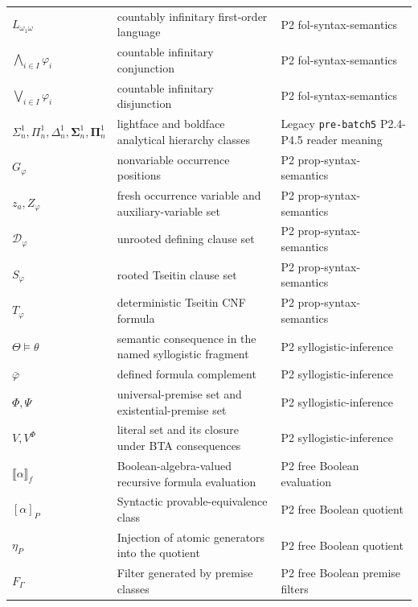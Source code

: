 \begin{longtable}{@{}p{}p{}p{}@{}}
\(L_{\omega_1\omega}\) & countably infinitary first-order language & P2 fol-\allowbreak{}syntax-\allowbreak{}semantics \\
\(\bigwedge_{i\in I}\varphi_i\) & countable infinitary conjunction & P2 fol-\allowbreak{}syntax-\allowbreak{}semantics \\
\(\bigvee_{i\in I}\varphi_i\) & countable infinitary disjunction & P2 fol-\allowbreak{}syntax-\allowbreak{}semantics \\
\(\Sigma^1_n,\allowbreak \Pi^1_n,\allowbreak \Delta^1_n,\allowbreak \boldsymbol\Sigma^1_n,\allowbreak \boldsymbol\Pi^1_n\) & lightface and boldface analytical hierarchy classes & Legacy \texttt{pre-\allowbreak{}batch5} P2.\allowbreak{}4-\allowbreak{}P4.\allowbreak{}5 reader meaning \\
\(G_\varphi\) & nonvariable occurrence positions & P2 prop-\allowbreak{}syntax-\allowbreak{}semantics \\
\(z_a,\allowbreak Z_\varphi\) & fresh occurrence variable and auxiliary-variable set & P2 prop-\allowbreak{}syntax-\allowbreak{}semantics \\
\(\mathcal D_\varphi\) & unrooted defining clause set & P2 prop-\allowbreak{}syntax-\allowbreak{}semantics \\
\(S_\varphi\) & rooted Tseitin clause set & P2 prop-\allowbreak{}syntax-\allowbreak{}semantics \\
\(T_\varphi\) & deterministic Tseitin CNF formula & P2 prop-\allowbreak{}syntax-\allowbreak{}semantics \\
\(\Theta\models\theta\) & semantic consequence in the named syllogistic fragment & P2 syllogistic-\allowbreak{}inference \\
\(\bar\varphi\) & defined formula complement & P2 syllogistic-\allowbreak{}inference \\
\(\Phi,\allowbreak \Psi\) & universal-premise set and existential-premise set & P2 syllogistic-\allowbreak{}inference \\
\(V,\allowbreak V^\Phi\) & literal set and its closure under BTA consequences & P2 syllogistic-\allowbreak{}inference \\
\(\llbracket\alpha\rrbracket_f\) & Boolean-algebra-valued recursive formula evaluation & P2 free Boolean evaluation \\
\([\alpha]_P\) & Syntactic provable-equivalence class & P2 free Boolean quotient \\
\(\eta_P\) & Injection of atomic generators into the quotient & P2 free Boolean quotient \\
\(F_\Gamma\) & Filter generated by premise classes & P2 free Boolean premise filters \\

\end{longtable}
